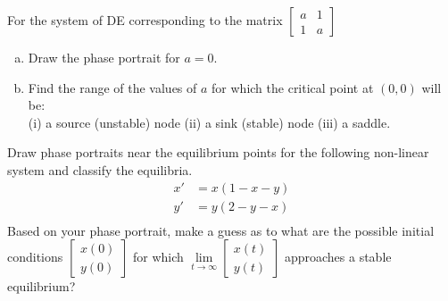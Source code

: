 \documentclass[11pt]{exam}
\begin{document}
\begin{questions}
	\addpoints
	\question[20]
	For the system of DE corresponding to the matrix $\begin{bmatrix} a & 1 \\ 1 & a \end{bmatrix}$
	\begin{enumerate}[a)]
		\item Draw the phase portrait for $a=0$.
		\item Find the range of the values of $a$ for which the critical point at $(0,0)$ will be:\\
		      (i) a source (unstable) node (ii) a sink (stable) node (iii) a saddle.
	\end{enumerate}

	\newpage








	\addpoints
	\question[20]
	Draw phase portraits near the equilibrium points for the following non-linear system and classify the equilibria.
	\begin{align*}
		x' & = x(1-x-y) \\
		y' & = y(2-y-x) \\
	\end{align*}
	Based on your phase portrait, make a guess as to what are the possible initial conditions $\begin{bmatrix} x(0) \\ y(0) \end{bmatrix}$ for which $\lim \limits_{t\rightarrow \infty}\begin{bmatrix} x(t) \\ y(t) \end{bmatrix}$ approaches a stable equilibrium?
	\newpage














\end{questions}
\end{document}
